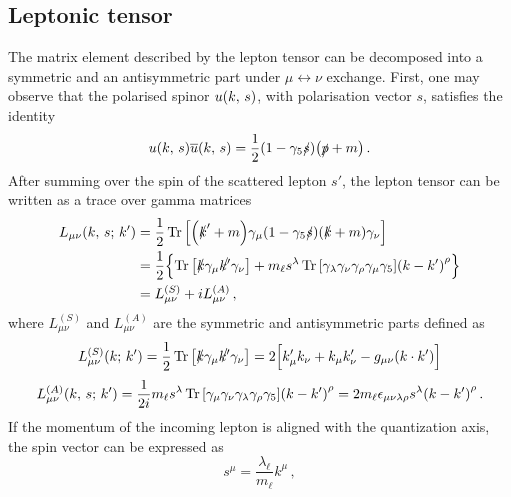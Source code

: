 \subsection*{Leptonic tensor}
The matrix element described by the lepton tensor can be decomposed into a symmetric and an antisymmetric part under $\mu \leftrightarrow \nu$ exchange. First, one may observe that the polarised spinor $u \qty(k, \, s)$, with polarisation vector $s$, satisfies the identity 
\begin{equation}
    u \qty(k, \, s) \overline{u} \qty(k,\,s) = \frac{1}{2} (1 - \gamma_5 \slashed{s})  \qty(\slashed{p} + m)\,.
\end{equation}
After summing over the spin of the scattered lepton $s'$, the lepton tensor can be written as a trace over gamma matrices
\begin{equation}
    \begin{split}
        L_{\mu \nu} \qty(k,\,s;\, k') &= \frac{1}{2} \Trace \qty[ \qty(\slashed{k}' + m) \gamma_{\mu} \qty(1 - \gamma_5 \slashed{s}) \qty(\slashed{k} + m) \gamma_{\nu} ]\\
        & = \frac{1}{2} \Bigl\{ \Trace \qty[ \slashed{k} \gamma_{\mu} \slashed{k'} \gamma_{\nu} ] + m_{\ell} s^{\lambda} \Trace \qty[ \gamma_{\lambda} \gamma_{\nu} \gamma_{\rho} \gamma_{\mu} \gamma_{5} ] \qty( k - k' )^{\rho} \Bigr\}\\
        & = L_{\mu \nu}^{(S)} + i L_{\mu \nu}^{(A)} \,,
    \end{split}
\end{equation}
where $L_{\mu \nu}^{(S)}$ and $L_{\mu \nu}^{(A)}$ are the symmetric and antisymmetric parts defined as 
\begin{equation}
  L_{\mu \nu}^{(S)} \qty(k;\, k') = \frac{1}{2} \Trace \qty[ \slashed{k} \gamma_{\mu} \slashed{k'} \gamma_{\nu} ] = 2 \Bigl[k'_{\mu} k_{\nu} + k_{\mu} k_{\nu}' - g_{\mu \nu} \qty( k \cdot k' ) \Bigr]
\end{equation}
\begin{equation}
  L_{\mu \nu}^{(A)} \qty(k,\,s;\, k') = \frac{1}{2i} m_{\ell} s^{\lambda} \Trace \qty[  \gamma_{\mu} \gamma_{\nu} \gamma_{\lambda} \gamma_{\rho} \gamma_{5} ] \qty( k - k' )^{\rho} = 2m_{\ell} \epsilon_{\mu \nu \lambda \rho } s^{\lambda} \qty( k - k' )^{\rho}\,.
\end{equation}
If the momentum of the incoming lepton is aligned with the quantization axis, the spin vector can be expressed as
\begin{equation}
    s^{\mu} = \frac{\lambda_{\ell}}{m_{\ell}} k^{\mu}\, ,
    \label{eq:ch2:spin_vector}
\end{equation}
